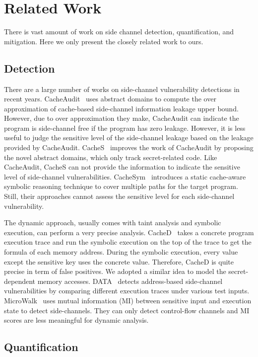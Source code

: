 \section{Related Work}

There is vast amount of work on side channel detection, quantification, and
mitigation. Here we only present the closely related work to ours.

\subsection{Detection}

There are a large number of works on side-channel vulnerability detections in
recent years.  CacheAudit~\cite{182946} uses abstract domains to compute the
over approximation of cache-based side-channel information leakage upper bound.
However, due to over approximation they make, CacheAudit can indicate the
program is side-channel free if the program has zero leakage.  However, it is
less useful to judge the sensitive level of the side-channel leakage based on
the leakage provided by CacheAudit. CacheS~\cite{236338} improves the work of
CacheAudit by proposing the novel abstract domains, which only track
secret-related code. Like CacheAudit, CacheS can not provide the information to
indicate the sensitive level of side-channel vulnerabilities.
CacheSym~\cite{Brotzman19Casym} introduces a static cache-aware symbolic
reasoning technique to cover multiple paths for the target program. Still, their
approaches cannot assess the sensitive level for each side-channel
vulnerability.

The dynamic approach, usually comes with taint analysis and symbolic execution,
can perform a very precise analysis. CacheD~\cite{203878} takes a concrete
program execution trace and run the symbolic execution on the top of the trace
to get the formula of each memory address. During the symbolic execution, every
value except the sensitive key uses the concrete value. Therefore, CacheD is
quite precise in term of false positives. We adopted a similar idea to model the
secret-dependent memory accesses. DATA~\cite{217537} detects address-based
side-channel vulnerabilities by comparing different execution traces under
various test inputs. MicroWalk~\cite{Wichelmann:2018:MFF:3274694.3274741} uses
mutual information (MI) between sensitive input and execution state to detect
side-channels. They can only detect control-flow channels and MI scores are less
meaningful for dynamic analysis.

\subsection{Quantification}

